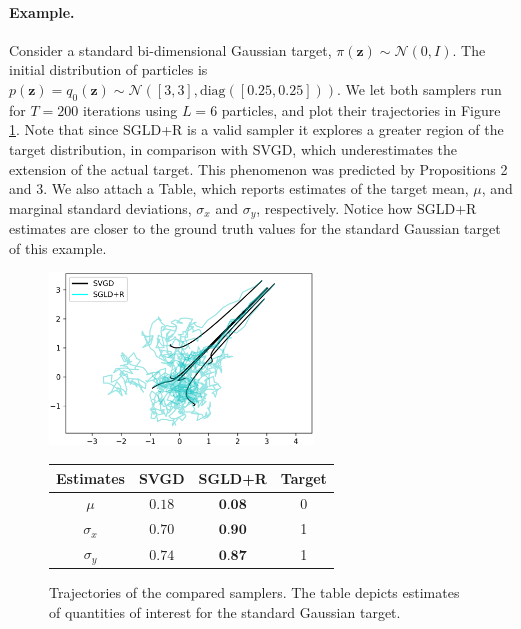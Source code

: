 \paragraph{Example.} Consider a standard bi-dimensional Gaussian target, $\pi(\bm{z}) \sim \mathcal{N}(0, I)$. The initial distribution of particles is $p(\bm{z}) = q_0(\bm{z}) \sim \mathcal{N}([3,3], \mbox{diag}([0.25, 0.25]))$. We let both samplers run for $T = 200$ iterations using $L = 6$ particles, and plot their trajectories in Figure \ref{fig:comp}. Note that since SGLD+R is a valid sampler it explores a greater region of the target distribution, in comparison with SVGD, which underestimates the extension of the actual target. This phenomenon was predicted by Propositions 2 and 3. We also attach a Table, which reports estimates of the target mean, $\mu$, and marginal standard deviations, $\sigma_x$ and $\sigma_y$, respectively. Notice how SGLD+R estimates are closer to the ground truth values for the standard Gaussian target of this example.

\begin{figure}[!ht]
    \centering
    \includegraphics[width=7cm]{img/svgd_vs_sgldr-2.png}
    \qquad
    \begin{tabular}[b]{cccc}\hline
      \textbf{Estimates} & \textbf{SVGD} & \textbf{SGLD+R} & \textbf{Target} \\ \hline
      $\mu$ &  $0.18$ &$\textbf{0.08}$  & 0\\
      $\sigma_{x}$ & $0.70$ & $\textbf{0.90}$ & 1\\
      $\sigma_{y}$  & $0.74$ & $\textbf{0.87}$ & 1\\
    \hline
    \end{tabular}
    \caption{Trajectories of the compared samplers. The table depicts estimates of quantities of interest for the standard Gaussian target.}
    \label{fig:comp}
  \end{figure}



